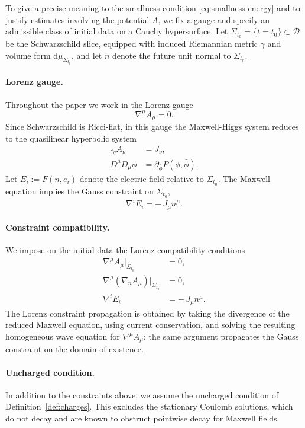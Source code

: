 \documentclass[11pt]{article}
\numberwithin{equation}{section}
\theoremstyle{plain}
\theoremstyle{definition}
\theoremstyle{remark}
\newcommand{\D}{\mathcal{D}}
\newcommand{\dd}{\mathrm{d}}
\begin{document}
To give a precise meaning to the smallness condition \eqref{eq:smallness-energy} and to justify estimates involving the potential $A$, we fix a gauge and specify an admissible class of initial data on a Cauchy hypersurface.
Let $\Sigma_{t_0}=\{t=t_0\}\subset \D$ be the Schwarzschild slice, equipped with induced Riemannian metric $\gamma$ and volume form $\dd\mu_{\Sigma_{t_0}}$, and let $n$ denote the future unit normal to $\Sigma_{t_0}$.

\paragraph{Lorenz gauge.}
Throughout the paper we work in the Lorenz gauge
\begin{equation}\label{LG}
\nabla^\mu A_\mu = 0.
\end{equation}
Since Schwarzschild is Ricci-flat, in this gauge the Maxwell-Higgs system reduces to the quasilinear hyperbolic system
\begin{eqnarray}
\square_g A_\nu &= J_\nu,
\\
D^\mu D_\mu \phi &= \partial_{\bar\phi}P(\phi,\bar\phi).
\end{eqnarray}
Let $E_i:=F(n,e_i)$ denote the electric field relative to $\Sigma_{t_0}$.
The Maxwell equation implies the Gauss constraint on $\Sigma_{t_0}$,
\begin{equation}
\nabla^i E_i = -\,J_{\mu}n^{\mu}.
\end{equation}

\paragraph{Constraint compatibility.}
We impose on the initial data the Lorenz compatibility conditions
\begin{eqnarray}
\nabla^\mu A_\mu \big|_{\Sigma_{t_0}} &= 0,\\
\nabla^\mu (\nabla_n A_\mu)\big|_{\Sigma_{t_0}} &= 0,\\
\nabla^i E_i &= -\,J_{\mu}n^{\mu}.
\end{eqnarray}
The Lorenz constraint propagation is obtained by taking the divergence of the reduced Maxwell equation, using current conservation, and solving the resulting homogeneous wave equation for \(\nabla^\mu A_\mu\); the same argument propagates the Gauss constraint on the domain of existence.

\paragraph{Uncharged condition.}
In addition to the constraints above, we assume the uncharged condition of Definition~\ref{def:charges}.
This excludes the stationary Coulomb solutions, which do not decay and are known to obstruct pointwise decay for Maxwell fields.
\end{document}
